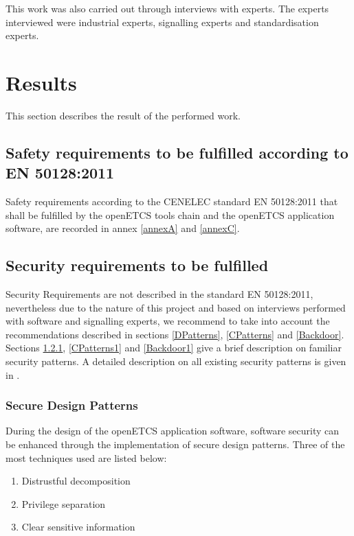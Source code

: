 \documentclass{template/openetcs_report}
\begin{document}
This work was also carried out through interviews with experts. The experts interviewed were industrial experts, signalling experts and standardisation experts. 


\chapter{Results}

This section describes the result of the performed work.

\section{Safety requirements to be fulfilled according to EN 50128:2011}

Safety requirements according to the CENELEC standard EN 50128:2011 that shall be fulfilled by the openETCS tools chain and the openETCS application software, are recorded in annex \ref{annexA} and \ref{annexC}.


\section{Security requirements to be fulfilled}

Security Requirements are not described in the standard EN 50128:2011, nevertheless due to the nature of this project and based on interviews performed with software and signalling experts, we recommend to take into account the recommendations described in sections \ref{DPatterns}, \ref{CPatterns} and \ref{Backdoor}.\\
Sections \ref{DPatterns1}, \ref{CPatterns1} and \ref{Backdoor1} give a brief description on familiar security patterns. A detailed description on all existing security patterns is given in \cite{SECU-doc}.

\subsection{Secure Design Patterns}
\label{DPatterns1}
During the design of the openETCS application software, software security can be enhanced through the implementation of secure design patterns. 
Three of the most techniques used are listed below:
\begin{enumerate}
  \item Distrustful decomposition
  \item Privilege separation
  \item Clear sensitive information
\end{enumerate}
\end{document}

